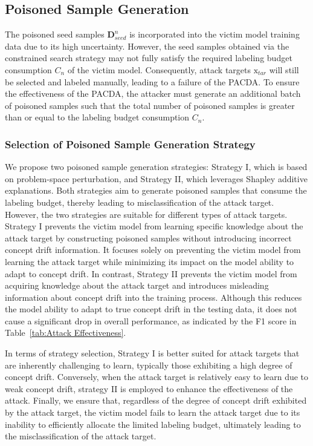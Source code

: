 \documentclass[conference,compsoc]{IEEEtran} %
\begin{document}
\subsection{Poisoned Sample Generation}
\label{Sec: Poisoned Sample Generation}
The poisoned seed samples $\bm{D}_{seed}^{n}$ is incorporated into the victim model  training data due to its high uncertainty.
However, the seed samples obtained via the constrained search strategy may not fully satisfy the required labeling budget consumption $C_{n}$ of the victim model.
Consequently, attack targets $\bm{\mathrm{x}}_{tar}$ will still be selected and labeled manually, leading to a failure of the PACDA.
To ensure the effectiveness of the PACDA, the attacker must generate an additional batch of poisoned samples such that the total number of poisoned samples is greater than or equal to the labeling budget consumption $C_{n}$.

\subsubsection{Selection of Poisoned Sample Generation Strategy}
\label{Sec: Selection of Poisoned Sample Generation Strategy}

We propose two poisoned sample generation strategies: Strategy I, which is based on problem-space perturbation, and Strategy II, which leverages Shapley additive explanations.
Both strategies aim to generate poisoned samples that consume the labeling budget, thereby leading to misclassification of the attack target.
However, the two strategies are suitable for different types of attack targets.
Strategy I prevents the victim model from learning specific knowledge about the attack target by constructing poisoned samples without introducing incorrect concept drift information.
It focuses solely on preventing the victim model from learning the attack target while minimizing its impact on the model  ability to adapt to concept drift.
In contrast, Strategy II prevents the victim model from acquiring knowledge about the attack target and introduces misleading information about concept drift into the training process.
Although this reduces the model  ability to adapt to true concept drift in the testing data, it does not cause a significant drop in overall performance, as indicated by the F1 score in Table~\ref{tab:Attack Effectiveness}.

In terms of strategy selection, Strategy I is better suited for attack targets that are inherently challenging to learn, typically those exhibiting a high degree of concept drift.
Conversely, when the attack target is relatively easy to learn due to weak concept drift, strategy II is employed to enhance the effectiveness of the attack.
Finally, we ensure that, regardless of the degree of concept drift exhibited by the attack target, the victim model fails to learn the attack target due to its inability to efficiently allocate the limited labeling budget, ultimately leading to the misclassification of the attack target.
\end{document}
